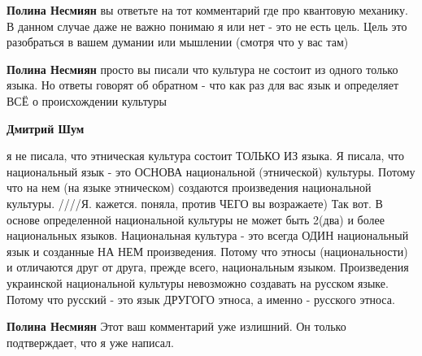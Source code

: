 \begin{itemize}
\begin{itemize}
 
\textbf{Полина Несмиян} вы ответьте на тот комментарий где про квантовую
механику. В данном случае даже не важно понимаю я или нет - это не есть цель.
Цель это разобраться в вашем думании или мышлении (смотря что у вас там)

 
\textbf{Полина Несмиян} просто вы писали что культура не состоит из одного
только языка. Но ответы говорят об обратном - что как раз для вас язык и
определяет ВСЁ о происхождении культуры

 
\textbf{Дмитрий Шум} 

я не писала, что этническая культура состоит ТОЛЬКО ИЗ
языка. Я писала, что национальный язык - это ОСНОВА национальной (этнической)
культуры. Потому что на нем (на языке этническом) создаются произведения
национальной культуры. ////Я. кажется. поняла, против ЧЕГО вы возражаете) Так
вот. В основе определенной национальной культуры не может быть 2(два) и более
национальных языков. Национальная культура - это всегда ОДИН национальный язык
и созданные НА НЕМ произведения. Потому что этносы (национальности) и
отличаются друг от друга, прежде всего, национальным языком. Произведения
украинской национальной культуры невозможно создавать на русском языке. Потому
что русский - это язык ДРУГОГО этноса, а именно - русского этноса.

 
\textbf{Полина Несмиян} Этот ваш комментарий уже излишний. Он только подтверждает, что я уже написал.


\end{itemize}
\end{itemize}

